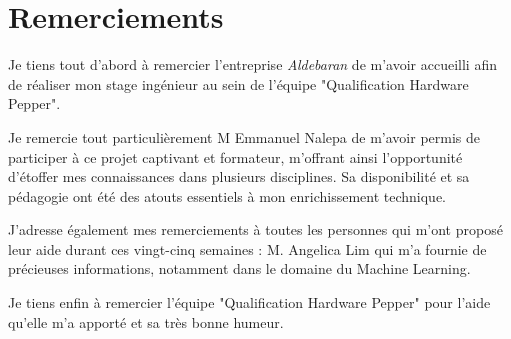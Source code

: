 \chapter*{Remerciements}
\thispagestyle{fancy}
\label{Remerciements}

Je tiens tout d'abord à remercier l'entreprise \emph{Aldebaran} de m'avoir accueilli afin de réaliser mon stage ingénieur au sein de l'équipe "Qualification Hardware Pepper".

Je remercie tout particulièrement M Emmanuel Nalepa de m'avoir permis de participer à ce projet captivant et formateur, m'offrant ainsi l'opportunité d'étoffer mes connaissances dans plusieurs disciplines. Sa disponibilité et sa pédagogie ont été des atouts essentiels à mon enrichissement technique.

J’adresse également mes remerciements à toutes les personnes qui m’ont proposé leur aide durant ces vingt-cinq semaines :
M. Angelica Lim qui m’a fournie de précieuses informations, notamment dans le domaine du Machine Learning.

Je tiens enfin à remercier l'équipe "Qualification Hardware Pepper" pour l'aide qu'elle m'a apporté et sa très bonne humeur.
